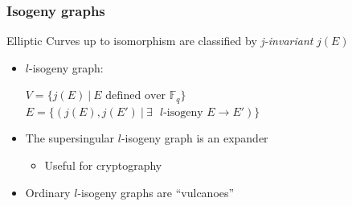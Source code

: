 \documentclass{beamer}
\newcommand{\F}{\mathbb{F}}
\begin{document}
\begin{frame}
    \frametitle{Isogeny graphs}
    Elliptic Curves up to isomorphism are classified by \emph{j-invariant} $j(E)$
    \begin{itemize}[<+->]
        \item $l$-isogeny graph: \begin{minipage}[t]{0.6\textwidth}
            $V = \{ j(E) \ | \ \text{$E$ defined over $\F_q$} \}$\\
            $E = \{ (j(E), j(E') \ | \ \text{$\exists$ $l$-isogeny $E \to E'$}) \}$
        \end{minipage}
        \item The supersingular $l$-isogeny graph is an expander
        \begin{itemize}
            \item Useful for cryptography
        \end{itemize}
        \item Ordinary $l$-isogeny graphs are ``vulcanoes''
    \end{itemize}
\end{frame}
\end{document}
